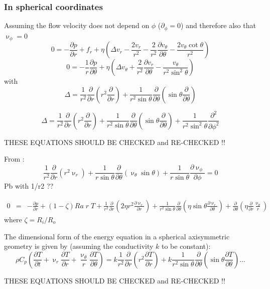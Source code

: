 \subsubsection{In spherical coordinates}




Assuming the flow velocity does not depend on $\phi$ ($\partial_\phi =0$) and therefore also that $\upnu_\phi=0$
\[
0=-\frac{\partial p}{\partial r} + f_r + \eta \left(\Delta v_r - \frac{2v_r}{r^2} -\frac{2}{r^2} \frac{\partial v_\theta}{\partial \theta} - \frac{2 v_\theta \cot \theta }{r^2} \right)
\]
\[
0 = -\frac{1}{r} \frac{\partial p}{\partial \theta} + \eta \left(\Delta v_\theta + \frac{2}{r^2} \frac{\partial v_r}{\partial \theta}  - \frac{v_\theta}{r^2 \sin^2 \theta} \right)
\]
with
\[
\Delta = \frac{1}{r^2} \frac{\partial }{\partial r}\left( r^2 \frac{\partial }{\partial r}\right)
+\frac{1}{r^2 \sin\theta} \frac{\partial }{\partial \theta}
\left(
\sin\theta \frac{\partial }{\partial\theta}
\right)
\]


\[
\Delta = \frac{1}{r^2} \frac{\partial }{\partial r}\left( r^2 \frac{\partial }{\partial r}\right)
+\frac{1}{r^2 \sin\theta} \frac{\partial }{\partial \theta}
\left(
\sin\theta \frac{\partial }{\partial\theta}
\right)
+ \frac{1}{r^2 \sin^2\theta} \frac{\partial^2 }{\partial\phi^2}
\]

THESE EQUATIONS SHOULD BE CHECKED and RE-CHECKED !!



From \cite{zebi93}:
\begin{equation}
\frac{1}{r^2} \frac{\partial}{\partial r} (r^2 \upnu_r) + 
\frac{1}{r \sin \theta} \frac{\partial}{\partial \theta} (\upnu_\theta \sin \theta)+
\frac{1}{r \sin \theta} \frac{\partial \upnu_\phi}{\partial \phi} = 0
\end{equation}
Pb with 1/r2 ??

\begin{eqnarray}
0 &=& -\frac{\partial p}{\partial r} + (1-\zeta) Ra \; r \; T + 
\frac{1}{r^2}\frac{\partial}{\partial r} \left( 2 \eta r^2 \frac{\partial \upnu_r}{\partial r} \right)
+ \frac{1}{r^2 \sin\theta} \frac{\partial}{\partial\theta} 
\left( \eta \sin\theta \frac{\partial \upnu_r}{\partial\theta} \right)
+\frac{\partial}{\partial \theta} \left(\eta \frac{\partial}{\partial r} \frac{\upnu_\theta}{r} \right)
\end{eqnarray}
where $\zeta=R_i/R_o$


The dimensional form of the energy equation in a spherical axisymmetric geometry is given by
(assuming the conductivity $k$ to be constant):
\[
\rho C_p \left( \frac{\partial T}{\partial t}  + 
\upnu_r \frac{\partial T}{\partial r} + \frac{\upnu_\theta}{r} \frac{\partial T}{\partial \theta}
\right)
=
k \frac{1}{r^2} \frac{\partial}{\partial r} \left( r^2 \frac{\partial T}{\partial r} \right)
+
k \frac{1}{r^2 \sin\theta} 
\frac{\partial}{\partial \theta} \left( \sin\theta \frac{\partial T}{\partial \theta}  \right) 
...
\]

THESE EQUATIONS SHOULD BE CHECKED and RE-CHECKED !!



